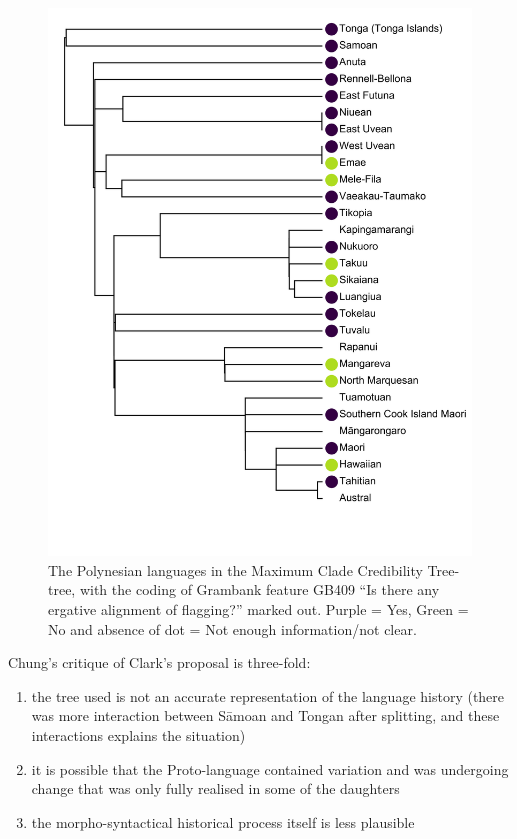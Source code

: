 \documentclass[12pt,letterpaper]{article}
\begin{document}
\begin{figure}[!ht]
\centering
\includegraphics[width=14cm]{illustrations/plots_from_R//tree_plots/poly_tree_example.png}
\caption{{The Polynesian languages in the \citet{grayetal_2009} Maximum Clade Credibility Tree-tree, with the coding of Grambank feature GB409 ``Is there any ergative alignment of flagging?'' marked out. Purple = Yes, Green = No and absence of dot = Not enough information/not clear.}}
\label{poly_GB409_tree}
\end{figure} 

Chung's critique of Clark's proposal is three-fold: 
\begin{enumerate}[label=(\alph*)]
\item the tree used is not an accurate representation of the language history (there was more interaction between S\={a}moan and Tongan after splitting, and these interactions explains the situation)
\item it is possible that the Proto-language contained variation and was undergoing change that was only fully realised in some of the daughters
\item the morpho-syntactical historical process itself is less plausible
\end{enumerate}
\end{document}
